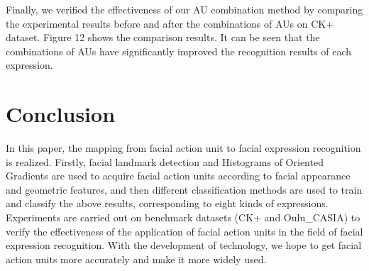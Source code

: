 \documentclass[10pt, conference, compsocconf]{IEEEtran}
\begin{document}
Finally, we verified the effectiveness of our AU combination method by comparing the experimental results before and after the combinations of AUs on CK+ dataset. Figure 12 shows the comparison results. It can be seen that the combinations of AUs have significantly improved the recognition results of each expression.

\section{Conclusion}

In this paper, the mapping from facial action unit to facial expression recognition is realized. Firstly, facial landmark detection and Histograms of Oriented Gradients are used to acquire facial action units according to facial appearance and geometric features, and then different classification methods are used to train and classify the above results, corresponding to eight kinds of expressions. Experiments are carried out on benchmark datasets (CK+ and Oulu\_CASIA) to verify the effectiveness of the application of facial action units in the field of facial expression recognition. With the development of technology, we hope to get facial action units more accurately and make it more widely used.


%
%

\end{document}
